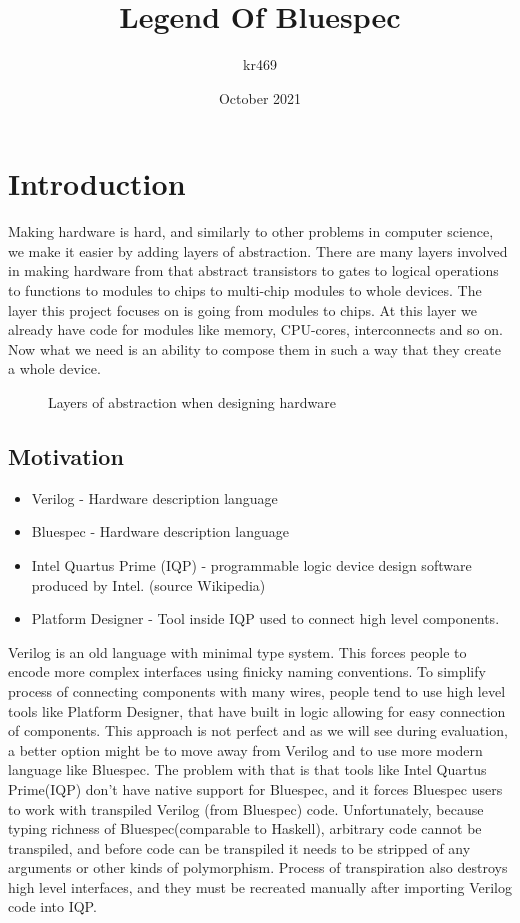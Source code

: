 \documentclass[14pt]{report}
\title{Legend Of Bluespec}
\author{kr469 }
\date{October 2021}
\begin{document}
\maketitle
\tableofcontents

\chapter{Introduction}

Making hardware is hard, and similarly to other problems in computer science, we make it easier by adding layers of abstraction. There are many layers involved in making hardware from that abstract transistors to gates to logical operations to functions to modules to chips to multi-chip modules to whole devices. The layer this project focuses on is going from modules to chips. At this layer we already have code for modules like memory, CPU-cores, interconnects and so on. Now what we need is an ability to compose them in such a way that they create a whole device.
\begin{figure}[!h]
    \centering
    \caption{Layers of abstraction when designing hardware}
    
\end{figure}
\section{Motivation}
\begin{tcolorbox}[title=Vocabulary]
    \begin{itemize}
        \item Verilog - Hardware description language
        \item Bluespec - Hardware description language
        \item Intel Quartus Prime (IQP) - programmable logic device design software produced by Intel. (source Wikipedia)
        \item Platform Designer - Tool inside IQP used to connect high level components.
    \end{itemize}
\end{tcolorbox}
Verilog is an old language with minimal type system. This forces people to encode more complex interfaces using finicky naming conventions. To simplify process of connecting components with many wires, people tend to use high level tools like Platform Designer, that have built in logic allowing for easy connection of components. This approach is not perfect and as we will see during evaluation, a better option might be to move away from Verilog and to use more modern language like Bluespec. The problem with that is that tools like Intel Quartus Prime(IQP) don't have native support for Bluespec, and it forces Bluespec users to work with transpiled Verilog (from Bluespec) code. Unfortunately, because typing richness of Bluespec(comparable to Haskell), arbitrary code cannot be transpiled, and before code can be transpiled it needs to be stripped of any arguments or other kinds of polymorphism. Process of transpiration also destroys high level interfaces, and they must be recreated manually after importing Verilog code into IQP. 
\end{document}
